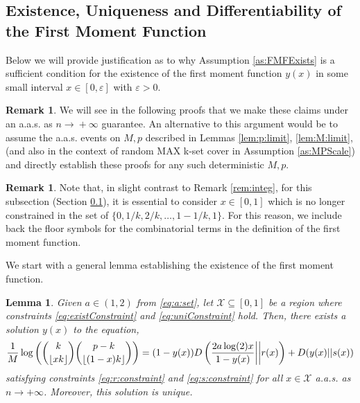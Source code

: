 \documentclass[12pt,reqno]{amsart}
\numberwithin{equation}{section}
\newtheorem{lemma}[theorem]{Lemma}
\theoremstyle{definition}
\newtheorem{remark}[theorem]{Remark}
\newcommand{\floor}[1]{\left\lfloor #1 \right\rfloor}
\renewcommand{\epsilon}{\varepsilon}
\newcommand{\conv}[1]{\overset{#1}{\rightarrow}}
\renewcommand{\[}{\begin{equation}}
\renewcommand{\]}{\end{equation}}
\newcommand{\scr}{\mathcal}
\renewcommand{\|}{\bigg{|}}
\newcommand{\kset}{random MAX k-set cover }
\newcommand{\ngrow}{\ensuremath{n \conv{} +\infty} }
\begin{document}
\subsection{Existence, Uniqueness and Differentiability of the First Moment Function}\label{sec:uniqueProof}


Below we will provide justification as to why Assumption \ref{as:FMFExists} is a sufficient condition for the existence of the first moment function $y(x)$ in some small interval $x \in [0,\epsilon]$ with $\epsilon > 0$. 

\begin{remark}\label{rem:Scale}We will see in the following proofs that we make these claims under an a.a.s. as \ngrow guarantee. An alternative to this argument would be to assume the a.a.s. events on $M,p$ described in Lemmas \ref{lem:p:limit}, \ref{lem:M:limit}, (and also in the context of \kset in Assumption \ref{as:MPScale}) and directly establish these proofs for any such deterministic $M,p$. \end{remark}


\begin{remark}
    Note that, in slight contrast to Remark \ref{rem:integ}, for this subsection (Section \ref{sec:uniqueProof}), it is essential to consider $x \in [0,1]$ which is no longer constrained in the set of $\{0,1/k, 2/k, \dots, 1-1/k,1\}$. For this reason, we include back the floor symbols for the combinatorial terms in the definition of the first moment function.
\end{remark}
We start with a general lemma establishing the existence of the first moment function.
\begin{lemma}\label{lem:FMFUnique}
    Given $a \in (1,2)$ from \eqref{eq:a:set}, let $\scr{X} \subseteq [0,1]$ be a region where constraints \eqref{eq:existConstraint} and \eqref{eq:uniConstraint} hold. Then, there exists a solution $y(x)$ to the equation, 
    \[\frac{1}{M}\log\left(\binom{k}{\floor{xk}}\binom{p-k}{\floor{(1-x)k}} \right) = (1-y(x))D\left(\frac{2a\log(2)x}{1-y(x)}\|\|r(x) \right) + D(y(x)||s(x))\]
    satisfying constraints \eqref{eq:r:constraint} and \eqref{eq:s:constraint} for all $x \in \scr{X}$  a.a.s. as $n \rightarrow +\infty$. Moreover, this solution is unique.
\end{lemma}
\end{document}
